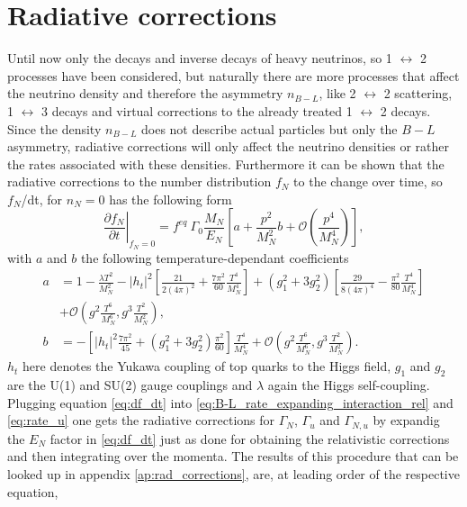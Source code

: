\section{Radiative corrections}
Until now only the decays and inverse decays of heavy neutrinos, so 1 $\leftrightarrow$ 2 processes have been considered, but naturally there are more processes that affect the neutrino density and therefore the asymmetry $n_{B-L}$, like 2 $\leftrightarrow$ 2 scattering, 1 $\leftrightarrow$ 3 decays and virtual corrections to the already treated 1 $\leftrightarrow$ 2 decays. \newline\indent
Since the density $n_{B-L}$ does not describe actual particles but only the $B-L$ asymmetry, radiative corrections will only affect the neutrino densities or rather the rates associated with these densities. Furthermore it can be shown that the radiative corrections to the number distribution $f_N$ to the change over time, so $f_N$/dt, for $n_N=0$ has the following form \cite{Laine:2011pq}
\begin{equation}
\left.\frac{\partial f_N}{\partial t}\right|_{f_N=0}=f^{eq}\:\Gamma_0\frac{M_N}{E_N}\left[a+\frac{p^2}{M_N^2}b+\mathcal{O}\left(\frac{p^4}{M_N^4}\right)\right],
\label{eq:df_dt}
\end{equation}
with $a$ and $b$ the following temperature-dependant coefficients
\begin{align}
a&=1-\frac{\lambda T^2}{M_N^2}-\left|h_t\right|^2\left[\frac{21}{2(4\pi)^2}+\frac{7\pi^2}{60}\frac{T^4}{M_N^4}\right]+\left(g_1^2+3g_2^2\right)\left[\frac{29}{8\left(4\pi\right)^4}-\frac{\pi^2}{80}\frac{T^4}{M_N^4}\right]\\
\nonumber
&+\mathcal{O}\left(g^2\frac{T^6}{M_N^6},g^3\frac{T^2}{M_N^2}\right),\\
b&=-\left[\left|h_t\right|^2\frac{7\pi^2}{45}+\left(g_1^2+3g_2^2\right)\frac{\pi^2}{60}\right]\frac{T^4}{M_N^4}+\mathcal{O}\left(g^2\frac{T^6}{M_N^6},g^3\frac{T^2}{M_N^2}\right).
\end{align}
$h_t$ here denotes the Yukawa coupling of top quarks to the Higgs field, $g_1$ and $g_2$ are the U(1) and SU(2) gauge couplings and $\lambda$ again the Higgs self-coupling. \newline\indent
Plugging equation \eqref{eq:df_dt} into \eqref{eq:B-L_rate_expanding_interaction_rel} and \eqref{eq:rate_u} one gets the radiative corrections for $\Gamma_N$, $\Gamma_u$ and $\Gamma_{N,u}$ by expandig the $E_N$ factor in \eqref{eq:df_dt} just as done for obtaining the relativistic corrections and then integrating over the momenta. The results of this procedure that can be looked up in appendix \ref{ap:rad_corrections}, are, at leading order of the respective equation,
